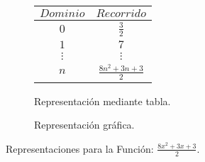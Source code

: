 \begin{figure}[h]
\centering
\begin{subfigure}[A]{0.3\textwidth}
\centering
\begin{tabular}{c|c}
$Dominio$ & $Recorrido$ \\ \hline
\hline
$0$ & $\frac{3}{2}$ \\ \hline
$1$ & $7$ \\ \hline
$\vdots$ & $\vdots$ \\ \hline
$n$& $\frac{8 n^{2} + 3 n + 3}{2}$ \\ \hline
\end{tabular} 
\caption{Representación mediante tabla.}

\end{subfigure}%
\quad
\begin{subfigure}[B]{0.3\textwidth}
\centering



\caption{Representación gráfica.}

\end{subfigure}

\caption{Representaciones para la Función: $\frac{8 x^{2} + 3 x + 3}{2}$.}

\end{figure}


